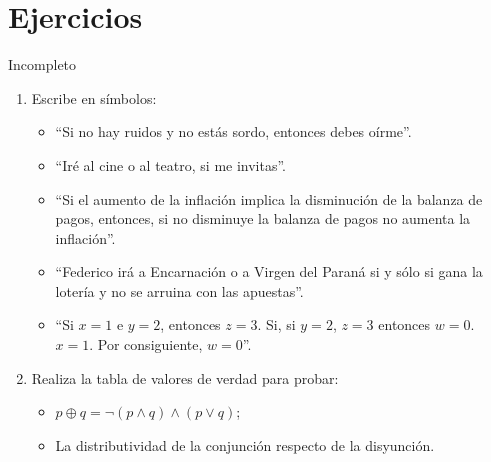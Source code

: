 \section{Ejercicios}

{ \color{red} Incompleto }

\begin{enumerate}[label=\textbf{\arabic*}.]
	\item Escribe en símbolos:
	\begin{itemize}
		\item ``Si no hay ruidos y no estás sordo, entonces debes oírme''.
		\item ``Iré al cine o al teatro, si me invitas''.
		\item ``Si el aumento de la inflación implica la disminución de la balanza de pagos, entonces, 
		si no disminuye la balanza de pagos no aumenta la inflación''.
		\item ``Federico irá a Encarnación o a Virgen del Paraná si y sólo si gana la lotería y no se 
		arruina con las apuestas''.
		\item ``Si $x = 1$ e $y = 2$, entonces $z = 3$. Si, si $y = 2$, $z = 3$ entonces $w = 0$. $x = 1$. Por consiguiente, $w = 0$''.
	\end{itemize}
	\item Realiza la tabla de valores de verdad para probar:
	\begin{itemize}
		\item $p \oplus q = \neg (p \land q) \land (p \lor q)$;
		\item La distributividad de la conjunción respecto de la disyunción.
	\end{itemize}
\end{enumerate}